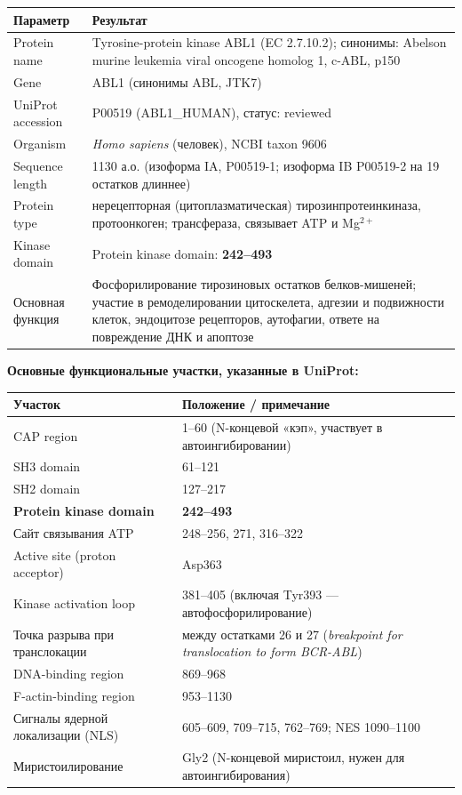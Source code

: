\documentclass[12pt,a4paper]{article}
\newcommand{\code}[1]{{\ttfamily #1}}
\begin{document}
\begin{center}
\begin{tabular}{L{4.2cm}L{10.3cm}}
\toprule
\textbf{Параметр} & \textbf{Результат} \\
\midrule
Protein name & Tyrosine-protein kinase ABL1 (EC 2.7.10.2); синонимы: Abelson murine leukemia viral oncogene homolog 1, c-ABL, p150 \\
Gene & \code{ABL1} (синонимы \code{ABL}, \code{JTK7}) \\
UniProt accession & \code{P00519} (\code{ABL1\_HUMAN}), статус: reviewed \\
Organism & \emph{Homo sapiens} (человек), NCBI taxon 9606 \\
Sequence length & 1130 а.о. (изоформа IA, \code{P00519-1}; изоформа IB \code{P00519-2} на 19 остатков длиннее) \\
Protein type & нерецепторная (цитоплазматическая) тирозинпротеинкиназа, протоонкоген; трансфераза, связывает ATP и Mg$^{2+}$ \\
Kinase domain & Protein kinase domain: \textbf{242--493} \\
Основная функция & Фосфорилирование тирозиновых остатков белков-мишеней; участие в ремоделировании цитоскелета, адгезии и подвижности клеток, эндоцитозе рецепторов, аутофагии, ответе на повреждение ДНК и апоптозе \\
\bottomrule
\end{tabular}
\end{center}

\medskip
\noindent\textbf{Основные функциональные участки, указанные в UniProt:}

\begin{center}
\begin{tabular}{L{6.2cm}L{8.3cm}}
\toprule
\textbf{Участок} & \textbf{Положение / примечание} \\
\midrule
CAP region & 1--60 (N-концевой «кэп», участвует в автоингибировании) \\
SH3 domain & 61--121 \\
SH2 domain & 127--217 \\
\textbf{Protein kinase domain} & \textbf{242--493} \\
Сайт связывания ATP & 248--256, 271, 316--322 \\
Active site (proton acceptor) & Asp363 \\
Kinase activation loop & 381--405 (включая Tyr393 --- автофосфорилирование) \\
Точка разрыва при транслокации & между остатками 26 и 27 (\emph{breakpoint for translocation to form BCR-ABL}) \\
DNA-binding region & 869--968 \\
F-actin-binding region & 953--1130 \\
Сигналы ядерной локализации (NLS) & 605--609, 709--715, 762--769; NES 1090--1100 \\
Миристоилирование & Gly2 (N-концевой миристоил, нужен для автоингибирования) \\
\bottomrule
\end{tabular}
\end{center}
\end{document}
